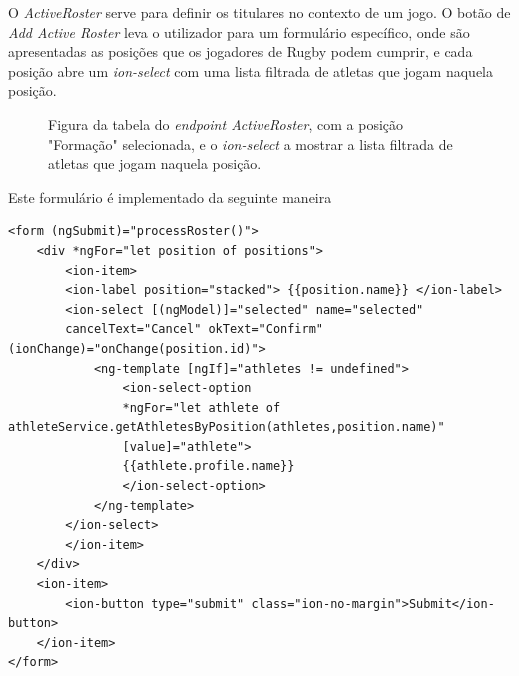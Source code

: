 O \textit{ActiveRoster} serve para definir os titulares no contexto de um jogo. O botão de \textit{Add Active Roster} leva o utilizador para um formulário específico, onde são apresentadas as posições que os jogadores de Rugby podem cumprir, e cada posição abre um \textit{ion-select} com uma lista filtrada de atletas que jogam naquela posição.

\begin{figure}[h]
	\begin{center}
	\end{center}
	\caption{Figura da tabela do \textit{endpoint ActiveRoster}, com a posição "Formação" selecionada, e o \textit{ion-select} a mostrar a lista filtrada de atletas que jogam naquela posição.}\label{fig:athleteprofile}
\end{figure}

Este formulário é implementado da seguinte maneira

\begin{lstlisting}
<form (ngSubmit)="processRoster()">
	<div *ngFor="let position of positions">
		<ion-item>
		<ion-label position="stacked"> {{position.name}} </ion-label>
		<ion-select [(ngModel)]="selected" name="selected"
		cancelText="Cancel" okText="Confirm" (ionChange)="onChange(position.id)">
			<ng-template [ngIf]="athletes != undefined">
				<ion-select-option
				*ngFor="let athlete of athleteService.getAthletesByPosition(athletes,position.name)"
				[value]="athlete">
				{{athlete.profile.name}}
				</ion-select-option>
			</ng-template>
		</ion-select>
		</ion-item>
	</div>
	<ion-item>
		<ion-button type="submit" class="ion-no-margin">Submit</ion-button>
	</ion-item>
</form>
\end{lstlisting}
\newpage

